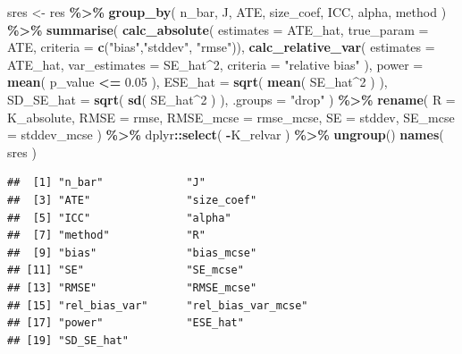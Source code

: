 \documentclass[
]{book}
\newenvironment{Shaded}{\begin{snugshade}}{\end{snugshade}}
\newcommand{\AttributeTok}[1]{\textcolor[rgb]{0.13,0.29,0.53}{#1}}
\newcommand{\DecValTok}[1]{\textcolor[rgb]{0.00,0.00,0.81}{#1}}
\newcommand{\FloatTok}[1]{\textcolor[rgb]{0.00,0.00,0.81}{#1}}
\newcommand{\FunctionTok}[1]{\textcolor[rgb]{0.13,0.29,0.53}{\textbf{#1}}}
\newcommand{\NormalTok}[1]{#1}
\newcommand{\OtherTok}[1]{\textcolor[rgb]{0.56,0.35,0.01}{#1}}
\newcommand{\SpecialCharTok}[1]{\textcolor[rgb]{0.81,0.36,0.00}{\textbf{#1}}}
\newcommand{\StringTok}[1]{\textcolor[rgb]{0.31,0.60,0.02}{#1}}
\begin{document}
\begin{Shaded}
\begin{Highlighting}[]
\NormalTok{sres }\OtherTok{\textless{}{-}}\NormalTok{ res }\SpecialCharTok{\%\textgreater{}\%} 
  \FunctionTok{group\_by}\NormalTok{( n\_bar, J, ATE, size\_coef, ICC, alpha, method ) }\SpecialCharTok{\%\textgreater{}\%}
  \FunctionTok{summarise}\NormalTok{( }\FunctionTok{calc\_absolute}\NormalTok{( }\AttributeTok{estimates =}\NormalTok{ ATE\_hat,}
                            \AttributeTok{true\_param =}\NormalTok{ ATE,}
                            \AttributeTok{criteria =} \FunctionTok{c}\NormalTok{(}\StringTok{"bias"}\NormalTok{,}\StringTok{"stddev"}\NormalTok{,}
                                         \StringTok{"rmse"}\NormalTok{)),}
             \FunctionTok{calc\_relative\_var}\NormalTok{( }\AttributeTok{estimates =}\NormalTok{ ATE\_hat,}
                                \AttributeTok{var\_estimates =}\NormalTok{ SE\_hat}\SpecialCharTok{\^{}}\DecValTok{2}\NormalTok{,}
                                \AttributeTok{criteria =} \StringTok{"relative bias"}\NormalTok{ ),}
             \AttributeTok{power =} \FunctionTok{mean}\NormalTok{( p\_value }\SpecialCharTok{\textless{}=} \FloatTok{0.05}\NormalTok{ ),}
             \AttributeTok{ESE\_hat =} \FunctionTok{sqrt}\NormalTok{( }\FunctionTok{mean}\NormalTok{( SE\_hat}\SpecialCharTok{\^{}}\DecValTok{2}\NormalTok{ ) ),}
             \AttributeTok{SD\_SE\_hat =} \FunctionTok{sqrt}\NormalTok{( }\FunctionTok{sd}\NormalTok{( SE\_hat}\SpecialCharTok{\^{}}\DecValTok{2}\NormalTok{ ) ),}
             \AttributeTok{.groups =} \StringTok{"drop"}
\NormalTok{  ) }\SpecialCharTok{\%\textgreater{}\%}
  \FunctionTok{rename}\NormalTok{( }\AttributeTok{R =}\NormalTok{ K\_absolute,}
          \AttributeTok{RMSE =}\NormalTok{ rmse,}
          \AttributeTok{RMSE\_mcse =}\NormalTok{ rmse\_mcse,}
          \AttributeTok{SE =}\NormalTok{ stddev,}
          \AttributeTok{SE\_mcse =}\NormalTok{ stddev\_mcse ) }\SpecialCharTok{\%\textgreater{}\%}
\NormalTok{  dplyr}\SpecialCharTok{::}\FunctionTok{select}\NormalTok{(  }\SpecialCharTok{{-}}\NormalTok{K\_relvar ) }\SpecialCharTok{\%\textgreater{}\%}
  \FunctionTok{ungroup}\NormalTok{()}
\FunctionTok{names}\NormalTok{( sres )}
\end{Highlighting}
\end{Shaded}

\begin{verbatim}
##  [1] "n_bar"             "J"                
##  [3] "ATE"               "size_coef"        
##  [5] "ICC"               "alpha"            
##  [7] "method"            "R"                
##  [9] "bias"              "bias_mcse"        
## [11] "SE"                "SE_mcse"          
## [13] "RMSE"              "RMSE_mcse"        
## [15] "rel_bias_var"      "rel_bias_var_mcse"
## [17] "power"             "ESE_hat"          
## [19] "SD_SE_hat"
\end{verbatim}
\end{document}
